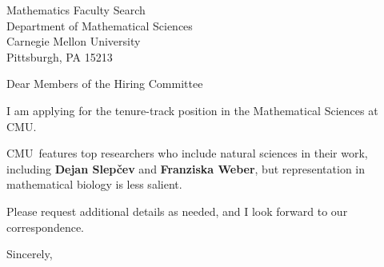 




	
	
	\def\School{CMU}
	
	\begin{letter}
		{Mathematics Faculty Search\\
			Department of Mathematical Sciences\\
			Carnegie Mellon University\\
			Pittsburgh, PA 15213
		}
		
		\opening{Dear Members of the Hiring Committee}
		
		
		I am applying for the tenure-track position in the Mathematical Sciences at \School. 
		
		\School~features top researchers who include natural sciences in their work, including \textbf{Dejan Slepčev} and \textbf{Franziska Weber}, but representation in mathematical biology is less salient. 
		
		
		
		
		
		Please request additional details as needed, and I look forward to our correspondence.
		
		\closing{Sincerely,}
	\end{letter}
